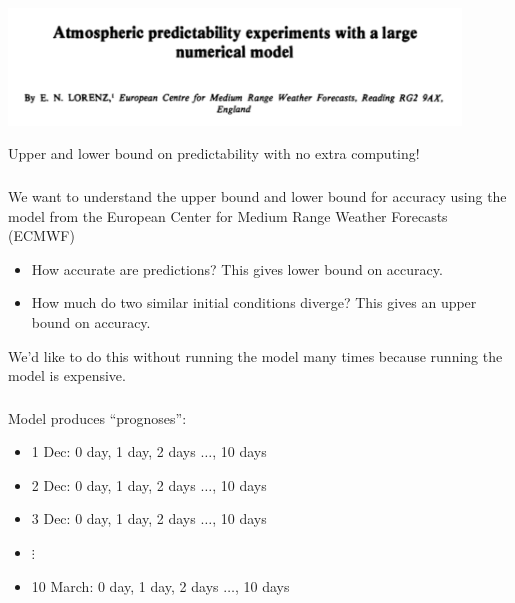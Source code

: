 \documentclass[aspectratio=169]{beamer}
\begin{document}
\begin{frame}

\begin{center}
\includegraphics[width = 0.9\textwidth]{figures/lorenz_atmospheric_1982_title}
\end{center}

\vfill
Upper and lower bound on predictability with no extra computing!  

\end{frame}
\begin{frame}
\frametitle{}

We want to understand the upper bound and lower bound for accuracy using the model from the European Center for Medium Range Weather Forecasts (ECMWF) 
\begin{itemize}
\item How accurate are predictions?  This gives lower bound on accuracy.
\pause
\item How much do two similar initial conditions diverge?  This gives an upper bound on accuracy.
\end{itemize}


We'd like to do this without running the model many times because running the model is expensive.

\end{frame}
\begin{frame}
\frametitle{}

Model produces ``prognoses'':
\begin{itemize}
\item 1 Dec: 0 day, 1 day, 2 days $\ldots$, 10 days
\item 2 Dec: 0 day, 1 day, 2 days $\ldots$, 10 days
\item 3 Dec: 0 day, 1 day, 2 days $\ldots$, 10 days
\item $\vdots$
\item 10 March: 0 day, 1 day, 2 days $\ldots$, 10 days
\end{itemize}
\end{frame}
\end{document}
